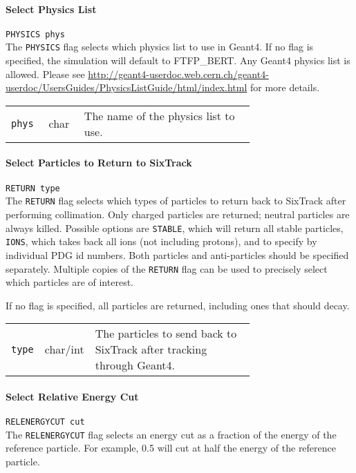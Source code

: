 \bigskip

\paragraph{Select Physics List} \texttt{PHYSICS phys}\\

The \texttt{PHYSICS} flag selects which physics list to use in Geant4.
If no flag is specified, the simulation will default to FTFP\_BERT.
Any Geant4 physics list is allowed.
Please see \url{http://geant4-userdoc.web.cern.ch/geant4-userdoc/UsersGuides/PhysicsListGuide/html/index.html} for more details.

\bigskip
\begin{tabular}{@{}llp{0.7\linewidth}}
    \texttt{phys} & char    & The name of the physics list to use.
\end{tabular}

\paragraph{Select Particles to Return to SixTrack} \texttt{RETURN type}\\

The \texttt{RETURN} flag selects which types of particles to return back to SixTrack after performing collimation.
Only charged particles are returned; neutral particles are always killed.
Possible options are \texttt{STABLE}, which will return all stable particles, \texttt{IONS}, which takes back all ions (not including protons), and to specify by individual PDG id numbers.
Both particles and anti-particles should be specified separately.
Multiple copies of the \texttt{RETURN} flag can be used to precisely select which particles are of interest.

If no flag is specified, all particles are returned, including ones that should decay.

\bigskip
\begin{tabular}{@{}llp{0.7\linewidth}}
    \texttt{type} & char/int & The particles to send back to SixTrack after tracking through Geant4.
\end{tabular}

\paragraph{Select Relative Energy Cut} \texttt{RELENERGYCUT cut}\\

The \texttt{RELENERGYCUT} flag selects an energy cut as a fraction of the energy of the reference particle.
For example, 0.5 will cut at half the energy of the reference particle.

